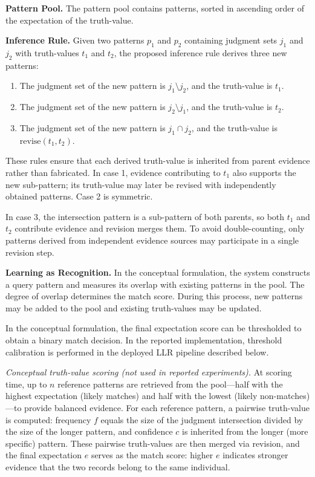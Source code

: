 \documentclass{article}
\begin{document}
\textbf{Pattern Pool.} The pattern pool contains patterns, sorted in ascending order of the expectation of the truth-value.

\textbf{Inference Rule.} Given two patterns $p_1$ and $p_2$ containing judgment sets $j_1$ and $j_2$ with truth-values $t_1$ and $t_2$, the proposed inference rule derives three new patterns:

\begin{enumerate}
    \item The judgment set of the new pattern is $j_1 \setminus j_2$, and the truth-value is $t_1$.
    \item The judgment set of the new pattern is $j_2 \setminus j_1$, and the truth-value is $t_2$.
    \item The judgment set of the new pattern is $j_1 \cap j_2$, and the truth-value is $\mathrm{revise}(t_1, t_2)$.
\end{enumerate}

These rules ensure that each derived truth-value is inherited from parent evidence rather than fabricated. In case 1, evidence contributing to $t_1$ also supports the new sub-pattern; its truth-value may later be revised with independently obtained patterns. Case 2 is symmetric.

In case 3, the intersection pattern is a sub-pattern of both parents, so both $t_1$ and $t_2$ contribute evidence and revision merges them. To avoid double-counting, only patterns derived from independent evidence sources may participate in a single revision step.

\textbf{Learning as Recognition.} In the conceptual formulation, the system constructs a query pattern and measures its overlap with existing patterns in the pool. The degree of overlap determines the match score. During this process, new patterns may be added to the pool and existing truth-values may be updated.

In the conceptual formulation, the final expectation score can be thresholded to obtain a binary match decision. In the reported implementation, threshold calibration is performed in the deployed LLR pipeline described below.


\emph{Conceptual truth-value scoring (not used in reported experiments).} At scoring time, up to $n$ reference patterns are retrieved from the pool---half with the highest expectation (likely matches) and half with the lowest (likely non-matches)---to provide balanced evidence. For each reference pattern, a pairwise truth-value is computed: frequency $f$ equals the size of the judgment intersection divided by the size of the longer pattern, and confidence $c$ is inherited from the longer (more specific) pattern. These pairwise truth-values are then merged via revision, and the final expectation $e$ serves as the match score: higher $e$ indicates stronger evidence that the two records belong to the same individual.
\end{document}
